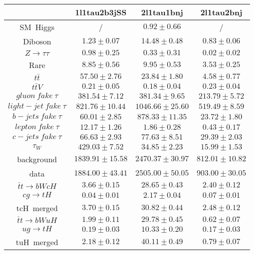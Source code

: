 \centering
\begin{tabular}{|c|c|c|c|} \hline
 & 1l1tau2b3jSS & 2l1tau1bnj & 2l1tau2bnj\\\hline
SM~Higgs &  / & $0.92\pm0.66$ &  /\\\hline
Diboson & $1.23\pm0.07$ & $14.48\pm0.48$ & $0.83\pm0.06$\\\hline
$Z\to\tau\tau$ & $0.98\pm0.25$ & $0.33\pm0.31$ & $0.02\pm0.02$\\\hline
Rare & $8.85\pm0.56$ & $9.95\pm0.53$ & $3.53\pm0.25$\\\hline
$t\bar{t}$ & $57.50\pm2.76$ & $23.84\pm1.80$ & $4.58\pm0.77$\\\hline
$t\bar{t}V$ & $0.21\pm0.05$ & $0.18\pm0.04$ & $0.23\pm0.04$\\\hline
$gluon~fake~\tau$ & $381.54\pm7.12$ & $381.34\pm9.65$ & $213.79\pm5.72$\\\hline
$light-jet~fake~\tau$ & $821.76\pm10.44$ & $1046.66\pm25.60$ & $519.49\pm8.59$\\\hline
$b-jets~fake~\tau$ & $60.01\pm2.85$ & $878.33\pm11.35$ & $23.72\pm1.80$\\\hline
$lepton~fake~\tau$ & $12.17\pm1.26$ & $1.86\pm0.28$ & $0.43\pm0.17$\\\hline
$c-jets~fake~\tau$ & $66.63\pm2.93$ & $77.63\pm8.51$ & $29.39\pm2.03$\\\hline
$\tau_{W}$ & $429.03\pm7.52$ & $34.85\pm2.23$ & $15.99\pm1.53$\\\hline
background & $1839.91\pm15.58$ & $2470.37\pm30.97$ & $812.01\pm10.82$\\\hline
data & $1884.00\pm43.41$ & $2505.00\pm50.05$ & $903.00\pm30.05$\\\hline
$\bar{t}t\to bWcH$ & $3.66\pm0.15$ & $28.65\pm0.43$ & $2.40\pm0.12$\\\hline
$cg\to tH$ & $0.04\pm0.01$ & $2.17\pm0.04$ & $0.07\pm0.01$\\\hline
tcH~merged & $3.70\pm0.15$ & $30.82\pm0.44$ & $2.48\pm0.12$\\\hline
$\bar{t}t\to bWuH$ & $1.99\pm0.11$ & $29.78\pm0.45$ & $0.62\pm0.07$\\\hline
$ug\to tH$ & $0.19\pm0.03$ & $10.33\pm0.20$ & $0.17\pm0.03$\\\hline
tuH~merged & $2.18\pm0.12$ & $40.11\pm0.49$ & $0.79\pm0.07$\\\hline
\end{tabular}

